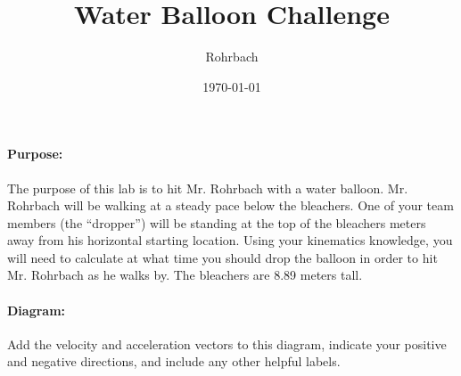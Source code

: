 \documentclass[10pt]{exam}
\title{Water Balloon Challenge}
\author{Rohrbach}
\date{\today}
\begin{document}
\maketitle

\paragraph{Purpose:}
  The purpose of this lab is to hit Mr. Rohrbach with a water balloon.  Mr. Rohrbach will be walking at a steady pace below the bleachers.  One of your team members (the ``dropper'') will be standing at the top of the bleachers \fillin{} meters away from his horizontal starting location.  Using your kinematics knowledge, you will need to calculate at what time you should drop the balloon in order to hit Mr. Rohrbach as he walks by. The bleachers are 8.89 meters tall.

\paragraph{Diagram:}
  Add the velocity and acceleration vectors to this diagram, indicate your positive and negative directions, and include any other helpful labels.
\end{document}
